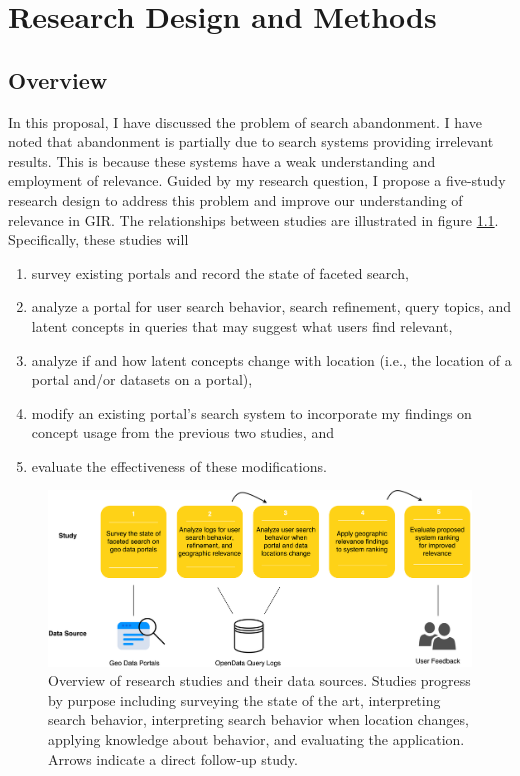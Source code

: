 \chapter{Research Design and Methods} \label{ch:[chapter 5 label]}

\section{Overview}
In this proposal, I have discussed the problem of search abandonment. I have noted that abandonment is partially due to search systems providing irrelevant results. This is because these systems have a weak understanding and employment of relevance. Guided by my research question, I propose a five-study research design to address this problem and improve our understanding of relevance in GIR. The relationships between studies are illustrated in figure \ref{fig:Methods_Overview}. Specifically, these studies will

\begin{enumerate}
    \item survey existing portals and record the state of faceted search,
    \item analyze a portal for user search behavior, search refinement, query topics, and latent concepts in queries that may suggest what users find relevant,
    \item analyze if and how latent concepts change with location (i.e., the location of a portal and/or datasets on a portal),
    \item modify an existing portal's search system to incorporate my findings on concept usage from the previous two studies, and
    \item evaluate the effectiveness of these modifications.
\end{enumerate}

\begin{figure}[H]
    \centering
    \includegraphics[width=1\textwidth]{../figures/Methods_Overview.png}
    \caption{Overview of research studies and their data sources. Studies progress by purpose including surveying the state of the art, interpreting search behavior, interpreting search behavior when location changes, applying knowledge about behavior, and evaluating the application. Arrows indicate a direct follow-up study.}
    \label{fig:Methods_Overview}
\end{figure}

